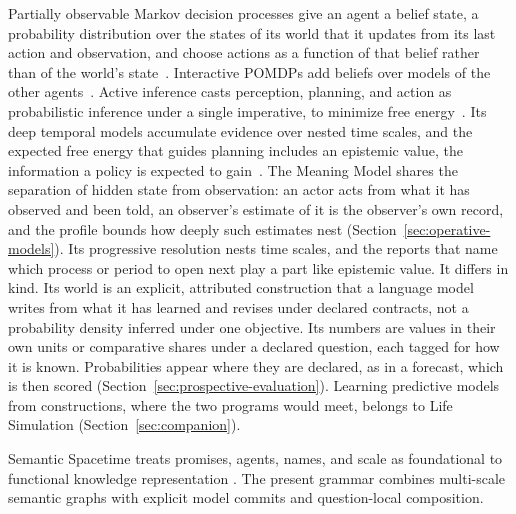 \documentclass[11pt,a4paper]{article}
\begin{document}
Partially observable Markov decision processes give an agent a belief state, a
probability distribution over the states of its world that it updates from its
last action and observation, and choose actions as a function of that belief
rather than of the world's state~\cite{kaelbling1998pomdp}. Interactive POMDPs
add beliefs over models of the other agents~\cite{gmytrasiewiczDoshi2005}.
Active inference casts perception, planning, and action as probabilistic
inference under a single imperative, to minimize free
energy~\cite{parrPezzuloFriston2022}. Its deep temporal models accumulate
evidence over nested time scales, and the expected free energy that guides
planning includes an epistemic value, the information a policy is expected to
gain~\cite{fristonEtAl2017deepTemporal}. The Meaning Model shares the
separation of hidden state from observation: an actor acts from what it has
observed and been told, an observer's estimate of it is the observer's own
record, and the profile bounds how deeply such estimates nest
(Section~\ref{sec:operative-models}). Its progressive resolution nests time
scales, and the reports that name which process or period to open next play a
part like epistemic value. It differs in kind. Its world is an explicit,
attributed construction that a language model writes from what it has learned
and revises under declared contracts, not a probability density inferred under
one objective. Its numbers are values in their own units or comparative shares
under a declared question, each tagged for how it is known. Probabilities
appear where they are declared, as in a forecast, which is then scored
(Section~\ref{sec:prospective-evaluation}). Learning predictive models from
constructions, where the two programs would meet, belongs to Life Simulation
(Section~\ref{sec:companion}).

Semantic Spacetime treats promises, agents, names, and scale as foundational to
functional knowledge representation \cite{burgess2016semanticSpacetimeIII,
burgess2017cognitiveReasoning,burgess2020narrativeII}. The present grammar
combines multi-scale semantic graphs with explicit model commits and
question-local composition.
\end{document}
